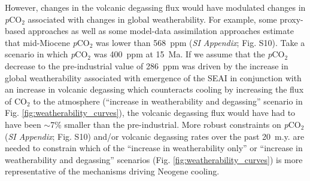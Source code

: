 \documentclass[9pt,twocolumn,twoside,lineno]{pnas-new}
\newcommand{\pCOtwo}{\textit{p}CO$_{2}$\xspace}
\newcommand{\COtwo}{CO$_{2}$\xspace}
\newcommand{\SI}{\textit{SI Appendix}\xspace}
\begin{document}
However, changes in the volcanic degassing flux would have modulated changes in \pCOtwo associated with changes in global weatherability. For example, some proxy-based approaches as well as some model-data assimilation approaches estimate that mid-Miocene \pCOtwo was lower than 568~ppm (\SI; Fig. S10). Take a scenario in which \pCOtwo was 400~ppm at 15~Ma. If we assume that the \pCOtwo decrease to the pre-industrial value of 286~ppm was driven by the increase in global weatherability associated with emergence of the SEAI in conjunction with an increase in volcanic degassing which counteracts cooling by increasing the flux of \COtwo to the atmosphere (``increase in weatherability and degassing'' scenario in Fig. \ref{fig:weatherability_curves}), the volcanic degassing flux would have had to have been $\sim$7\% smaller than the pre-industrial. More robust constraints on \pCOtwo (\SI; Fig. S10) and/or volcanic degassing rates over the past 20~m.y. are needed to constrain which of the ``increase in weatherability only'' or ``increase in weatherability and degassing'' scenarios (Fig. \ref{fig:weatherability_curves}) is more representative of the mechanisms driving Neogene cooling.
\end{document}
